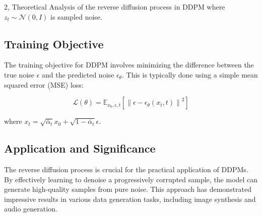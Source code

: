 \documentclass[10pt,a4paper]{article}
\begin{document}
\begin{task}{2,  Theoretical Analysis of the reverse diffusion process in DDPM}
where \( z_t \sim \mathcal{N}(0, I) \) is sampled noise.

\subsection{Training Objective}

The training objective for DDPM involves minimizing the difference between the true noise \( \epsilon \) and the predicted noise \( \epsilon_\theta \). This is typically done using a simple mean squared error (MSE) loss:

\[
\mathcal{L}(\theta) = \mathbb{E}_{x_0, \epsilon, t} \left[ \left\| \epsilon - \epsilon_\theta(x_t, t) \right\|^2 \right]
\]

where \( x_t = \sqrt{\bar{\alpha}_t} x_0 + \sqrt{1 - \bar{\alpha}_t} \epsilon \).

\subsection{Application and Significance}

The reverse diffusion process is crucial for the practical application of DDPMs. By effectively learning to denoise a progressively corrupted sample, the model can generate high-quality samples from pure noise. This approach has demonstrated impressive results in various data generation tasks, including image synthesis and audio generation.


\end{task}
\end{document}
